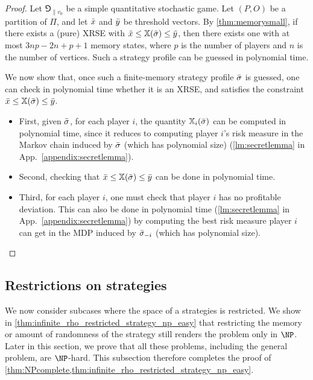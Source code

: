 \begin{proof}
    Let $\Game_{\|v_0}$ be a simple quantitative stochastic game.
    Let $(P,O)$ be a partition of $\Pi$, and let ${\bar{x}}$ and ${\bar{y}}$ be threshold vectors.
    By \cref{thm:memorysmall}, if there exists a (pure) XRSE with ${\bar{x}} \leq \mathbb{X}({\bar{\sigma}}) \leq {\bar{y}}$, then there exists one with at most $3np-2n+p+1$ memory states, where $p$ is the number of players and $n$ is the number of vertices.
    Such a strategy profile can be guessed in polynomial time.
    
    We now show that, once such a finite-memory strategy profile ${\bar{\sigma}}$ is guessed, one can check in polynomial time whether it is an XRSE, and satisfies the constraint ${\bar{x}} \leq \mathbb{X}({\bar{\sigma}}) \leq {\bar{y}}$.
    
    \begin{itemize}
        \item First, given ${\bar{\sigma}}$, for each player $i$, the quantity $\mathbb{X}_i({\bar{\sigma}})$ can be computed in polynomial time, since it reduces to computing player $i$'s risk measure in the Markov chain induced by ${\bar{\sigma}}$ (which has polynomial size) (\cref{lm:secretlemma} in App.~\ref{appendix:secretlemma}).

        \item Second, checking that ${\bar{x}} \leq \mathbb{X}({\bar{\sigma}}) \leq {\bar{y}}$ can be done in polynomial time.

        \item Third, for each player $i$, one must check that player $i$ has no profitable deviation.
        This can also be done in polynomial time (\cref{lm:secretlemma} in App.~\ref{appendix:secretlemma}) by computing the best risk measure player $i$ can get in the MDP induced by ${\bar{\sigma}}_{-i}$ (which has polynomial size).\qedhere \qedhere
    \end{itemize}
\end{proof}

\subsection{Restrictions on strategies}
We now consider subcases where the space of a strategies is restricted. 
We show in \cref{thm:infinite_rho_restricted_strategy_np_easy} that restricting the memory or amount of randomness of the strategy still renders the problem only in $\NP$.
Later in this section, we prove that all these problems, including the general problem, are $\NP$-hard. This subsection therefore completes the proof of \cref{thm:NPcomplete,thm:infinite_rho_restricted_strategy_np_easy}.


